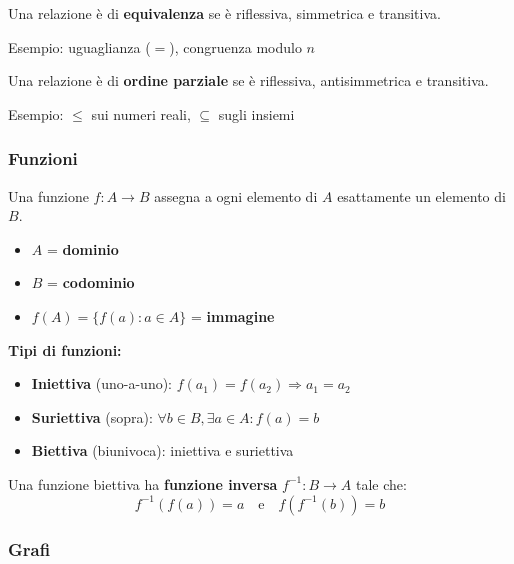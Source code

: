 \begin{definizione}
	Una relazione è di \textbf{equivalenza} se è riflessiva, simmetrica e transitiva.
	
	Esempio: uguaglianza ($=$), congruenza modulo $n$
\end{definizione}

\begin{definizione}
	Una relazione è di \textbf{ordine parziale} se è riflessiva, antisimmetrica e transitiva.
	
	Esempio: $\leq$ sui numeri reali, $\subseteq$ sugli insiemi
\end{definizione}

\subsubsection{Funzioni}

\begin{definizione}[Funzione]
	Una funzione $f: A \to B$ assegna a ogni elemento di $A$ esattamente un elemento di $B$.
	
	\begin{itemize}
		\item $A$ = \textbf{dominio}
		\item $B$ = \textbf{codominio}
		\item $f(A) = \{f(a) : a \in A\}$ = \textbf{immagine}
	\end{itemize}
\end{definizione}

\textbf{Tipi di funzioni:}
\begin{itemize}
	\item \textbf{Iniettiva} (uno-a-uno): $f(a_1) = f(a_2) \Rightarrow a_1 = a_2$
	\item \textbf{Suriettiva} (sopra): $\forall b \in B, \exists a \in A: f(a) = b$
	\item \textbf{Biettiva} (biunivoca): iniettiva e suriettiva
\end{itemize}

\begin{nota}
	Una funzione biettiva ha \textbf{funzione inversa} $f^{-1}: B \to A$ tale che:
	\[
	f^{-1}(f(a)) = a \quad \text{e} \quad f(f^{-1}(b)) = b
	\]
\end{nota}

\subsubsection{Grafi}

